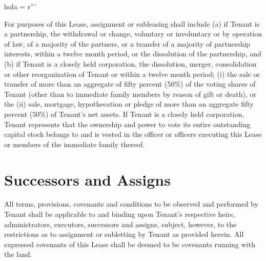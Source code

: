 hola = r'''\documentclass{article}
\begin{document}
    For purposes of this Lease, assignment or subleasing shall include (a) if Tenant is a partnership, the withdrawal or change, voluntary or involuntary or by operation of law, of a majority of the partners, or a transfer of a majority of partnership interests, within a twelve month period, or the dissolution of the partnership, and (b) if Tenant is a closely held corporation, the dissolution, merger, consolidation or other reorganization of Tenant or within a twelve month period; (i) the sale or transfer of more than an aggregate of fifty percent (50\%) of the voting shares of Tenant (other than to immediate family members by reason of gift or death), or the (ii) sale, mortgage, hypothecation or pledge of more than an aggregate fifty percent (50\%) of Tenant's net assets.  If Tenant is a closely held corporation, Tenant represents that the ownership and power to vote its entire outstanding capital stock belongs to and is vested in the officer or officers executing this Lease or members of the immediate family thereof. 
    
\section{Successors and Assigns}
    All terms, provisions, covenants and conditions to be observed and performed by Tenant shall be applicable to and binding upon Tenant's respective heirs, administrators, executors, successors and assigns, subject, however, to the restrictions as to assignment or subletting by Tenant as provided herein. All expressed covenants of this Lease shall be deemed to be covenants running with the land.
\end{document}
